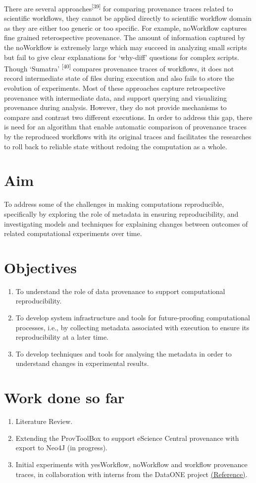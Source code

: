 \documentclass[6pt,,a4paper]{article}
\begin{document}
There are several approaches\textsuperscript{[39]} for comparing provenance traces related to scientific workflows, they cannot be applied directly to scientific workflow domain as they are either too generic or too specific. For example, noWorkflow captures fine grained reterospective provenance. The amount of information captured by the noWorkflow is extremely large which may succeed in analyzing small scripts but fail to give clear explanations for ‘why-diff’ questions for complex scripts.  Though ‘Sumatra’ \textsuperscript{[40]} compares provenance traces of workflows, it does not record intermediate state of files during execution and also fails to store the evolution of experiments. Most of these approaches capture retrospective provenance with intermediate data, and support querying and visualizing provenance during analysis. However, they do not provide mechanisms to compare and contrast two different executions. In order to address this gap, there is need for an algorithm that enable automatic comparison of provenance traces by the reproduced workflows with its original traces and facilitates the researches to roll back to reliable state without redoing the computation as a whole.
\section{\textbf{Aim}}
To address some of the challenges in making computations reproducible, specifically by exploring the role of metadata in ensuring reproducibility, and investigating models and techniques for explaining changes between outcomes of related computational experiments over time.
\section{\textbf{Objectives}}
\begin{enumerate}  \label{data}
 \item To understand the role of data provenance to support computational reproducibility.
\item To develop system infrastructure and tools for future-proofing computational processes, i.e., by collecting metadata associated with execution to ensure its reproducibility at a later time.
\item To develop techniques and tools for analysing the metadata in order to understand changes in experimental results.
\end{enumerate}
\setlength{\textfloatsep}{5pt}
\section{\textbf{Work done so far}}
\begin{enumerate} \label{data}
       \item Literature Review.
        \item Extending the ProvToolBox to support eScience Central provenance with export to Neo4J (in progress).
            \item Initial experiments with yesWorkflow, noWorkflow and workflow provenance traces, in collaboration with interns from the DataONE project  \href{https://docs.google.com/document/d/10mkbtjlx3jO_G1DjGfqbUJOdldOATgvR-3VCDSmYr04/edit}{(Reference)}. 
\end{enumerate}
\end{document}
